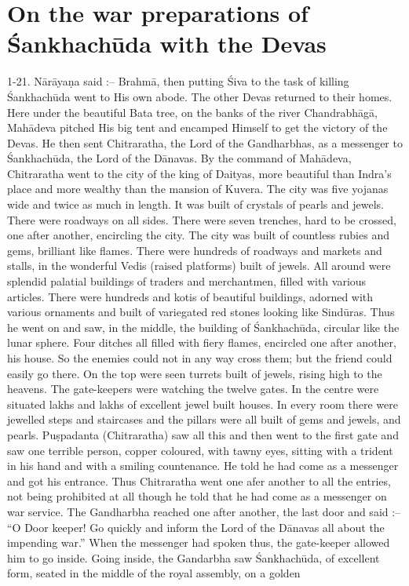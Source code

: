 \chapter{On the war preparations of \'Sankhach\=uda with the Devas}

1-21. N\=ar\=aya\d{n}a said :-- Brahm\=a, then putting \'Siva to the task of killing \'Sankhach\=uda went to His own abode. The other Devas returned to their homes. Here under the beautiful Bata tree, on the banks of the river Chandrabh\=ag\=a, Mah\=adeva pitched His big tent and encamped Himself to get the victory of the Devas. He then sent Chitraratha, the Lord of the Gandharbhas, as a messenger to \'Sankhach\=uda, the Lord of the D\=anavas. By the command of Mah\=adeva, Chitraratha went to the city of the king of Daityas, more beautiful than Indra's place and more wealthy than the mansion of Kuvera. The city was five yojanas wide and twice as much in length. It was built of crystals of pearls and jewels. There were roadways on all sides. There were seven trenches, hard to be crossed, one after another, encircling the city. The city was built of countless rubies and gems, brilliant like flames. There were hundreds of roadways and markets and stalls, in the wonderful Vedis (raised platforms) built of jewels. All around were splendid palatial buildings of traders and merchantmen, filled with various articles. There were hundreds and kotis of beautiful buildings, adorned with various ornaments and built of variegated red stones looking like Sind\=uras. Thus he went on and saw, in the middle, the building of \'Sankhach\=uda, circular like the lunar sphere. Four ditches all filled with fiery flames, encircled one after another, his house. So the enemies could not in any way cross them; but the friend could easily go there. On the top were seen turrets built of jewels, rising high to the heavens. The gate-keepers were watching the twelve gates. In the centre were situated lakhs and lakhs of excellent jewel built houses. In every room there were jewelled steps and staircases and the pillars were all built of gems and jewels, and pearls. Pu\d{s}padanta (Chitraratha) saw all this and then went to the first gate and saw one terrible person, copper coloured, with tawny eyes, sitting with a trident in his hand and with a smiling countenance. He told he had come as a messenger and got his entrance. Thus Chitraratha went one afer another to all the entries, not being prohibited at all though he told that he had come as a messenger on war service. The Gandharbha reached one after another, the last door and said :-- ``O Door keeper! Go quickly and inform the Lord of the D\=anavas all about the impending war.'' When the messenger had spoken thus, the gate-keeper allowed him to go inside. Going inside, the Gandarbha saw \'Sankhach\=uda, of excellent form, seated in the middle of the royal assembly, on a golden

